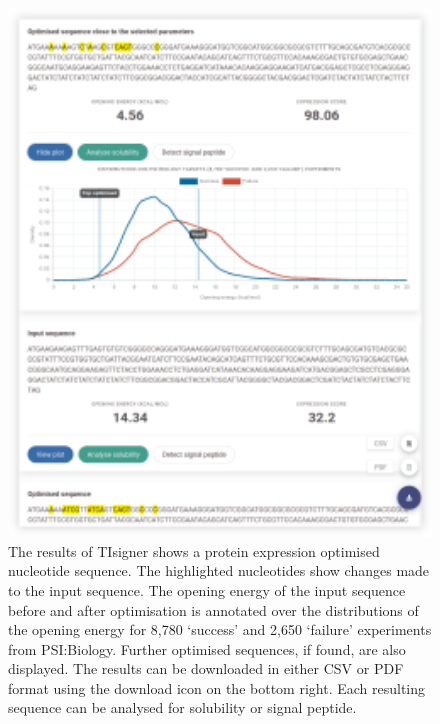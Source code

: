 \begin{figure}[!hbtp]
\includegraphics[width=1\textwidth]{chapters/TIsigner_Web/Fig/fig2.pdf}
\caption[The results of TIsigner shows a protein
expression optimised nucleotide sequence.]{The results of TIsigner shows a protein
expression optimised nucleotide sequence. The highlighted nucleotides
show changes made to the input sequence. The opening energy of the input
sequence before and after optimisation is annotated over the
distributions of the opening energy for 8,780 `success' and 2,650 `failure'
experiments from PSI:Biology. Further optimised sequences, if found, are
also displayed. The results can be downloaded in either CSV or PDF
format using the download icon on the bottom right. Each resulting
sequence can be analysed for solubility or signal peptide.}
\label{fig:nar_webserver_fig_2}
\end{figure}

